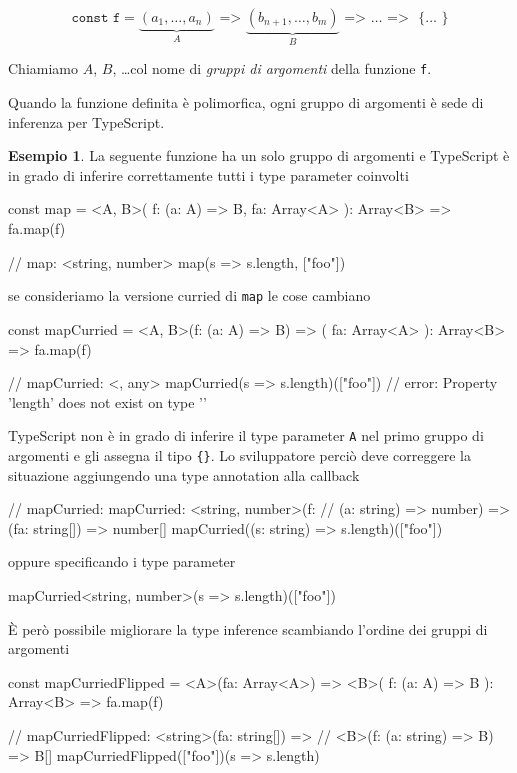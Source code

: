 \documentclass[12pt]{article}
\theoremstyle{definition}
\newtheorem{example}{Esempio}[subsection]
\newenvironment{code}
  {\vspace{0.5cm} \VerbatimEnvironment\begin{typescriptcode}}
  {\end{typescriptcode} \vspace{0.2cm}}
\begin{document}
$$
\texttt{const f} = \underbrace{(a_1, \ldots, a_n)}_A \texttt{ => } \underbrace{(b_{n + 1}, \ldots, b_m)}_B \texttt{ => } \ldots \texttt{ => } \texttt{ \{ } \ldots \texttt{ \} }
$$

Chiamiamo $A$, $B$, \ldots col nome di \emph{gruppi di argomenti} della funzione \texttt{f}.

Quando la funzione definita è polimorfica, ogni gruppo di argomenti è sede di inferenza per TypeScript.

\begin{example}
La seguente funzione ha un solo gruppo di argomenti e TypeScript è in grado di inferire correttamente tutti i type parameter coinvolti

\begin{code}
const map = <A, B>(
  f: (a: A) => B,
  fa: Array<A>
): Array<B> => fa.map(f)

// map: <string, number>
map(s => s.length, ["foo"])
\end{code}

se consideriamo la versione curried di \texttt{map} le cose cambiano

\begin{code}
const mapCurried = <A, B>(f: (a: A) => B) => (
  fa: Array<A>
): Array<B> => fa.map(f)

// mapCurried: <{}, any>
mapCurried(s => s.length)(["foo"])
// error: Property 'length' does not exist on type '{}'
\end{code}

TypeScript non è in grado di inferire il type parameter \texttt{A} nel primo gruppo di argomenti e gli assegna il tipo \texttt{\{\}}.
Lo sviluppatore perciò deve correggere la situazione aggiungendo una type annotation alla callback

\begin{code}
// mapCurried: mapCurried: <string, number>(f:
// (a: string) => number) => (fa: string[]) => number[]
mapCurried((s: string) => s.length)(["foo"])
\end{code}

oppure specificando i type parameter

\begin{code}
mapCurried<string, number>(s => s.length)(["foo"])
\end{code}

È però possibile migliorare la type inference scambiando l'ordine dei gruppi di argomenti

\begin{code}
const mapCurriedFlipped = <A>(fa: Array<A>) => <B>(
  f: (a: A) => B
): Array<B> => fa.map(f)

// mapCurriedFlipped: <string>(fa: string[]) =>
// <B>(f: (a: string) => B) => B[]
mapCurriedFlipped(["foo"])(s => s.length)
\end{code}
\end{example}
\end{document}
